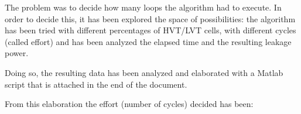 \documentclass[10pt, english, oneside]{article}
\begin{document}
The problem was to decide how many loops the algorithm had to execute. In order
to decide this, it has been explored the space of possibilities: the algorithm
has been tried with different percentages of HVT/LVT cells, with different cycles
(called effort) and has been analyzed the elapsed time and the resulting leakage
power.

Doing so, the resulting data has been analyzed and elaborated with a Matlab
script that is attached in the end of the document.

From this elaboration the effort (number of cycles) decided has been:
\end{document}
